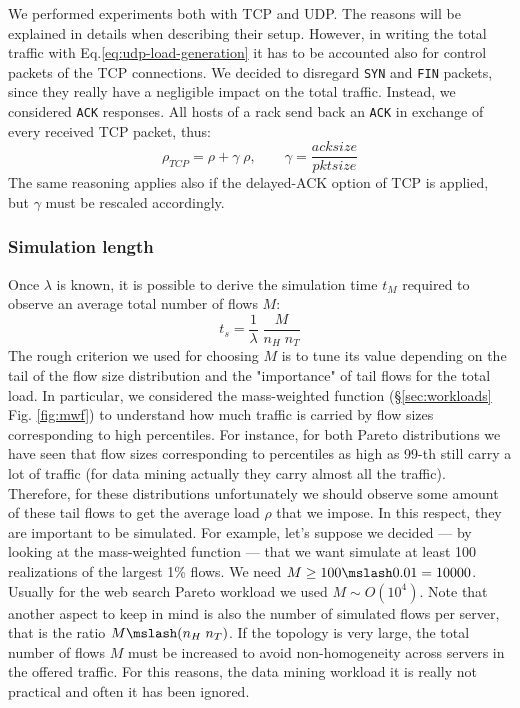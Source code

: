 We performed experiments both with TCP and UDP. The reasons will be explained in details when describing their setup. However, in writing the total traffic with Eq.\eqref{eq:udp-load-generation} it has to be accounted also for control packets of the TCP connections. We decided to disregard \texttt{SYN} and \texttt{FIN} packets, since they really have a negligible impact on the total traffic.  Instead, we considered \texttt{ACK} responses. All hosts of a rack send back an \texttt{ACK} in exchange of every received TCP packet, thus:
\begin{equation}
	\rho_{TCP} = \rho + \gamma \; \rho, \qquad \gamma = \dfrac{acksize}{pktsize}
\end{equation}
The same reasoning applies also if the delayed-ACK option of TCP is applied, but $\gamma$ must be rescaled accordingly.  \\
\subsubsection{Simulation length}
Once $\lambda$ is known, it is possible to derive the simulation time $t_M$ required to observe an average total number of flows $M$:
\[
t_s = \dfrac{1}{\lambda}\;\frac{M}{n_H \; n_T}
\]
The rough criterion we used for choosing $M$ is to tune its value depending on the tail of the flow size distribution and the "importance" of tail flows for the total load. In particular, we considered the mass-weighted function (\S \ref{sec:workloads} Fig. \ref{fig:mwf}) to understand how much traffic is carried by flow sizes corresponding to high percentiles. For instance, for both Pareto distributions we have seen that flow sizes corresponding to percentiles as high as 99-th still carry a lot of traffic (for data mining actually they carry almost all the traffic). Therefore, for these distributions unfortunately we should observe some amount of these tail flows to get the average load $\rho$ that we impose. In this respect, they are important to be simulated. For example, let's suppose we decided --- by looking at the mass-weighted function --- that we want simulate at least 100 realizations of the largest 1\% flows. We need $M \ge 100 \mslash 0.01 = 10000$. Usually for the web search Pareto workload we used $M \sim O(10^{4})$. Note that another aspect to keep in mind is also the number of simulated flows per server, that is the ratio $M \mslash (n_H \; n_T)$. If the topology is very large, the total number of flows $M$ must be increased to avoid non-homogeneity across servers in the offered traffic. For this reasons, the data mining workload it is really not practical and often it has been ignored. 
